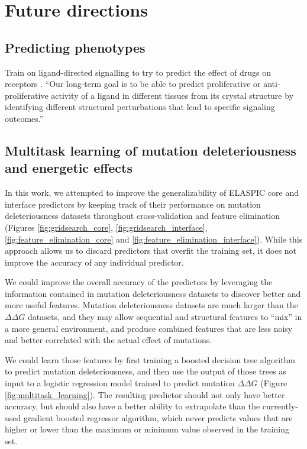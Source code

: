 
\chapter{Future directions} \label{ch:future_directions}


\section{Predicting phenotypes}

Train on ligand-directed signalling to try to predict the effect of drugs on receptors \cite{nwachukwu_predictive_2016}.
``Our long‐term goal is to be able to predict proliferative or anti‐proliferative activity of a ligand in different tissues from its crystal structure by identifying different structural perturbations that lead to specific signaling outcomes.''


\section{Multitask learning of mutation deleteriousness and energetic effects} \label{sec:multitask_learning}

In this work, we attempted to improve the generalizability of ELASPIC core and interface predictors by keeping track of their performance on mutation deleteriousness datasets throughout cross-validation and feature elimination (Figures \ref{fig:gridsearch_core}, \ref{fig:gridsearch_interface}, \ref{fig:feature_elimination_core} and \ref{fig:feature_elimination_interface}). While this approach allows us to discard predictors that overfit the training set, it does not improve the accuracy of any individual predictor.

We could improve the overall accuracy of the predictors by leveraging the information contained in mutation deleteriousness datasets to discover better and more useful features. Mutation deleteriousness datasets are much larger than the $\Delta \Delta G$ datasets, and they may allow sequential and structural features to ``mix'' in a more general environment, and produce combined features that are less noisy and better correlated with the actual effect of mutations.

We could learn those features by first training a boosted decision tree algorithm to predict mutation deleteriousness, and then use the output of those trees as input to a logistic regression model trained to predict mutation $\Delta \Delta G$ (Figure \ref{fig:multitask_learning}). The resulting predictor should not only have better accuracy, but should also have a better ability to extrapolate than the currently-used gradient boosted regressor algorithm, which never predicts values that are higher or lower than the maximum or minimum value observed in the training set.


